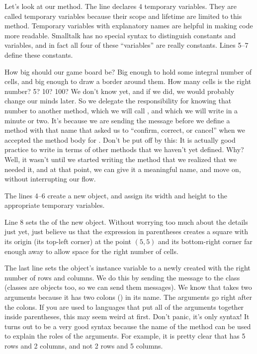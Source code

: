 \documentclass[a4paper,10pt,twoside]{book}
\begin{document}
Let's look at our  method.
The line   declares 4 temporary variables.
They are called temporary variables because their scope and lifetime are limited to this method.
Temporary variables with explanatory names are helpful in making code more readable.
Smalltalk has no special syntax to distinguish constants and variables, and in fact all four of these ``variables'' are really constants. 
Lines 5--7 define these constants.

How big should our game board be?
Big enough to hold some integral number of cells, and big enough to draw a border around them.
How many cells is the right number?
5? 10? 100?
We don't know yet, and if we did, we would probably change our minds later.
So we delegate the responsibility for knowing that number to another method, which we will call , and which we will write in a minute or two.
It's because we are sending the  message before we define a method with that name that \squeak asked us to ``confirm, correct, or cancel'' when we accepted the method body for .
Don't be put off by this:
It is actually good practice to write in terms of other methods that we haven't yet defined.
Why?
Well, it wasn't until we started writing the  method that we realized that we needed it, and at that point, we can give it a meaningful name, and move on, without interrupting our flow.

The lines 4--6 create a new  object, and assign its width and height to the appropriate temporary variables. 

Line 8 sets the  of the new object.
Without worrying too much about the details just yet, just believe us that the expression in parentheses creates a square with its origin (\ie its top-left corner) at the point $(5,5)$ and its bottom-right corner far enough away to allow space for the right number of cells.

The last line sets the  object's instance variable  to a newly created  with the right number of rows and columns.
We do this by sending the message  to the  class (classes are objects too, so we can send them messages).
We know that  takes two arguments because it has two colons (\ct{:}) in its name.
The arguments go right after the colons.
If you are used to languages that put all of the arguments together inside parentheses, this may seem weird at first.
Don't panic, it's only syntax!
It turns out to be a very good syntax because the name of the method can be used to explain the roles of the arguments.
For example, it is pretty clear that  has 5 rows and 2 columns, and not 2 rows and 5 columns.
\end{document}
